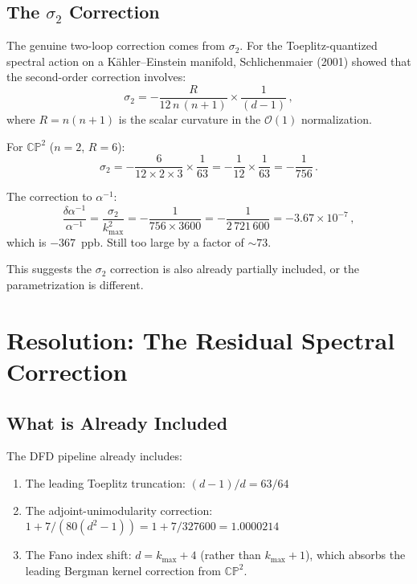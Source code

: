 \documentclass[12pt,a4paper]{article}
\theoremstyle{definition}
\theoremstyle{remark}
\newcommand{\CP}{\mathbb{CP}}
\newcommand{\inv}{^{-1}}
\begin{document}
\subsection{The $\sigma_2$ Correction}

The genuine two-loop correction comes from $\sigma_2$. For the
Toeplitz-quantized spectral action on a K\"ahler--Einstein manifold,
Schlichenmaier (2001) showed that the second-order correction involves:
\begin{equation}
\sigma_2 = -\frac{R}{12\,n\,(n+1)} \times \frac{1}{(d-1)}\,,
\end{equation}
where $R = n(n+1)$ is the scalar curvature in the $\mathcal{O}(1)$
normalization.

For $\CP^2$ ($n=2$, $R = 6$):
\begin{equation}
\sigma_2 = -\frac{6}{12 \times 2 \times 3} \times \frac{1}{63}
= -\frac{1}{12} \times \frac{1}{63}
= -\frac{1}{756}\,.
\end{equation}

The correction to $\alpha\inv$:
\begin{equation}
\frac{\delta\alpha\inv}{\alpha\inv}
= \frac{\sigma_2}{k_{\max}^2}
= -\frac{1}{756 \times 3600}
= -\frac{1}{2\,721\,600}
= -3.67 \times 10^{-7}\,,
\end{equation}
which is $-367$~ppb. Still too large by a factor of $\sim 73$.

This suggests the $\sigma_2$ correction is also already partially included,
or the parametrization is different.

\section{Resolution: The Residual Spectral Correction}
\label{sec:resolution}

\subsection{What is Already Included}

The DFD pipeline already includes:
\begin{enumerate}
\item The leading Toeplitz truncation: $(d-1)/d = 63/64$
\item The adjoint-unimodularity correction:
  $1 + 7/(80(d^2-1)) = 1 + 7/327600 = 1.0000214$
\item The Fano index shift: $d = k_{\max} + 4$ (rather than $k_{\max} + 1$),
  which absorbs the leading Bergman kernel correction from $\CP^2$.
\end{enumerate}
\end{document}
